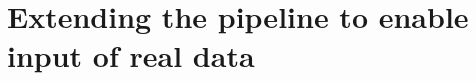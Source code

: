\section{Extending the pipeline to enable input of real data}

\begin{comment}
Premise: Have a working pipeline to collect, train and render novel views from CARLA
Question: How can this pipeline be extended to enable input of real data?

\begin{itemize}
    \item How to collect images and camera poses from the car?
    \item Which changes had to be done to the pipeline to support this change?
\end{itemize}
\end{comment}



